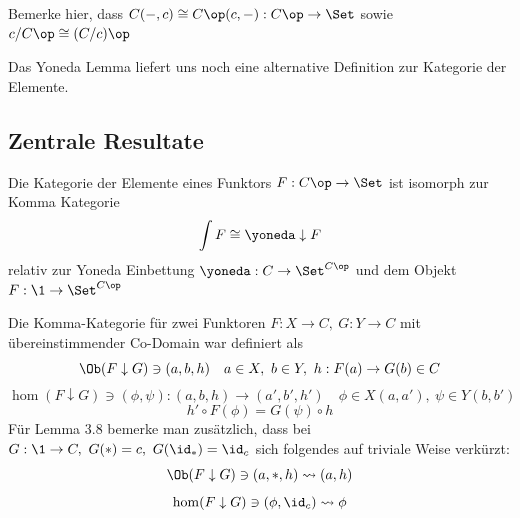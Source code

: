 \documentclass[11pt]{article}
\begin{document}
\begin{note}
Bemerke hier, dass $C(-,c) \cong C\op(c,-): C\op \to \Set$ sowie $c/C\op \cong (C/c)\op$
\end{note}

Das Yoneda Lemma liefert uns noch eine alternative Definition zur Kategorie der Elemente.

\subsection{Zentrale Resultate}
\begin{lemma}  Die Kategorie der Elemente eines Funktors $F: C\op \to \Set$ ist isomorph zur Komma Kategorie 
$$\int F\cong \yoneda \downarrow F$$
relativ zur Yoneda Einbettung $\yoneda: C\to \Set^{C\op}$ und dem Objekt $F:\1 \to \Set ^{C\op}$
\end{lemma}
\begin{note}
    Die Komma-Kategorie für zwei Funktoren $F:X\to C,\ G: Y\to C$ mit übereinstimmender Co-Domain war definiert als
    $$\Ob(F\downarrow G)\ni (a,b,h)\quad a\in X, \ b\in Y, \ h: F(a) \to G(b) \in C$$
    $$ \hom (F\downarrow G) \ni (\phi,\psi): (a,b,h)\to (a',b',h') \quad \phi \in X(a,a'), \ \psi \in Y(b,b')$$
    $$h'\circ F(\phi) = G(\psi) \circ h $$
    Für Lemma 3.8 bemerke man zusätzlich, dass bei $G:\1 \to C, \ G(*)=c, \ G(\id_*)=\id_c$ sich folgendes auf triviale Weise verkürzt:
    $$\Ob(F\downarrow G)\ni(a,*,h) \leadsto (a,h)$$
    $$\hom(F\downarrow G) \ni (\phi,\id_c) \leadsto \phi $$
\end{note}
\end{document}
